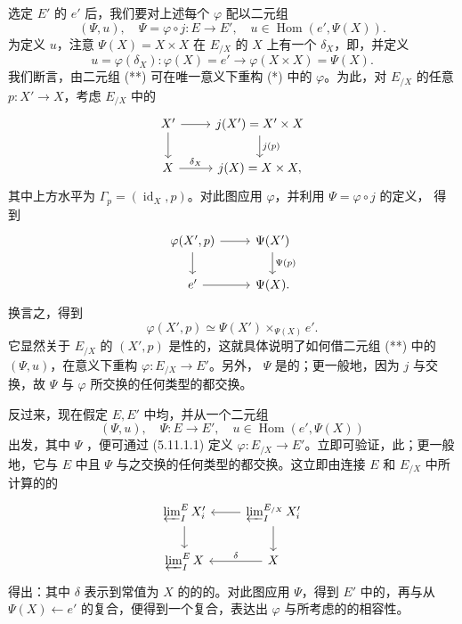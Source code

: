 选定 $E'$ 的 $e'$ 后，我们要对上述每个 $\varphi$ 配以二元组
\[(\Psi,u),\quad\Psi=\varphi\circ j:E\to E',\quad u\in\operatorname{Hom}(e',\Psi(X)).\tag{**}\]
为定义 $u$，注意 $\Psi(X)=X\times X$ 在 $E_{/X}$ 的 $X$ 上有一个 $\delta_X$，即，并定义
\[u=\varphi(\delta_X):\varphi(X)=e'\longrightarrow\varphi(X\times X)=\Psi(X).\]
我们断言，由二元组 (**) 可在唯一意义下重构 (*) 中的 $\varphi$。为此，对 $E_{/X}$ 的任意 $p:X'\to X$，考虑 $E_{/X}$ 中的
\[\begin{tikzcd}X'\arrow[r]\arrow[d]&j(X')=X'\times X\arrow[d,"j(p)"]\\X\arrow[r,"\delta_X"]&j(X)=X\times X,\end{tikzcd}\]
其中上方水平为 $\Gamma_p=(\operatorname{id}_X,p)$。对此图应用 $\varphi$，并利用 $\Psi=\varphi\circ j$ 的定义，
得到
\[\begin{tikzcd}\varphi(X',p)\arrow[r]\arrow[d]&\Psi(X')\arrow[d,"\Psi(p)"]\\e'\arrow[r]&\Psi(X).\end{tikzcd}\]
换言之，得到
\[\varphi(X',p)\simeq\Psi(X')\times_{\Psi(X)}e'.\tag{5.11.1.1}\]
它显然关于 $E_{/X}$ 的 $(X',p)$ 是性的，这就具体说明了如何借二元组 (**) 中的 $(\Psi,u)$，在意义下重构 $\varphi:E_{/X}\to E'$。另外， $\Psi$ 是的；更一般地，因为 $j$ 与交换，故 $\Psi$ 与 $\varphi$ 所交换的任何类型的都交换。

反过来，现在假定 $E,E'$ 中均，并从一个二元组
\[(\Psi,u),\quad\Psi:E\longrightarrow E',\quad u\in\operatorname{Hom}(e',\Psi(X))\]
出发，其中 $\Psi$ ，便可通过 (5.11.1.1) 定义 $\varphi:E_{/X}\to E'$。立即可验证，此；更一般地，它与 $E$ 中且 $\Psi$ 与之交换的任何类型的都交换。这立即由连接 $E$ 和 $E_{/X}$ 中所计算的的
\[\begin{tikzcd}\varprojlim_I^{E}X'_i\arrow[d]&\varprojlim_I^{E_{/X}}X'_i\arrow[l]\arrow[d]\\\varprojlim_I^{E}X&X\arrow[l,"\delta"']\end{tikzcd}\]
得出：其中 $\delta$ 表示到常值为 $X$ 的的的。对此图应用 $\Psi$，得到 $E'$ 中的，再与从 $\Psi(X)\leftarrow e'$ 的复合，便得到一个复合，表达出 $\varphi$ 与所考虑的的相容性。

